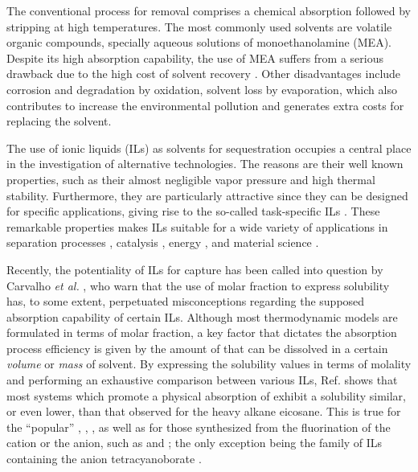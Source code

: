 \documentclass[3p,twocolumn]{elsarticle}
\begin{document}
The conventional process for  removal comprises a chemical absorption followed by stripping at high temperatures.
The most commonly used solvents are volatile organic compounds, specially aqueous solutions of monoethanolamine (MEA).
Despite its high absorption capability, the use of MEA suffers from a serious drawback due to the high cost of solvent recovery \cite{Merkel_2010}.
Other disadvantages include corrosion and degradation by oxidation, solvent loss by evaporation, which also contributes to increase the environmental pollution and generates extra costs for replacing the solvent.

The use of ionic liquids (ILs) as solvents for  sequestration occupies a central place in the investigation of alternative technologies.
The reasons are their well known properties, such as their almost negligible vapor pressure and high thermal stability.
Furthermore, they are particularly attractive since they can be designed for specific applications, giving rise to the so-called task-specific ILs \cite{Seo_2014}.
These remarkable properties makes ILs suitable for a wide variety of applications in separation processes \cite{Han_2010,Werner_2010}, catalysis \cite{P_rvulescu_2007}, energy \cite{MacFarlane_2014}, and material science \cite{Mecerreyes_2011,Tom_2015,Dupont_2010,Leones_2017,Kinik_2017}.

Recently, the potentiality of ILs for  capture has been called into question by Carvalho \textit{et al.} \cite{Carvalho_2016}, who warn that the use of molar fraction to express solubility has, to some extent, perpetuated misconceptions regarding the supposed absorption capability of certain ILs.
Although most thermodynamic models are formulated in terms of molar fraction, a key factor that dictates the absorption process efficiency is given by the amount of  that can be dissolved in a certain \textit{volume} or \textit{mass} of solvent.
By expressing the solubility values in terms of molality and performing an exhaustive comparison between various ILs, Ref. \cite{Carvalho_2016} shows that most systems which promote a physical absorption of  exhibit a solubility similar, or even lower, than that observed for the heavy alkane eicosane.
This is true for the ``popular'' \ce{[bmim][NTf_2]}, \ce{[bmim][PF_6]}, \ce{[bmim][BF_4]}, as well as for those synthesized from the fluorination of the cation or the anion, such as \ce{[(C_2H_2F_2)mim][NTf_2]} and \ce{[hmim][pFAP]}; the only exception being the family of ILs containing the anion tetracyanoborate \ce{[B(CN)_4]^-}.
\end{document}
